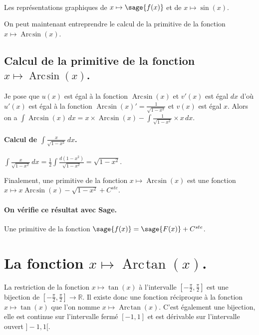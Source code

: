 \documentclass[a4paper,12pt]{report}
\def\eclaire{\mathbb}
\def\R{\ensuremath{\eclaire R}}
\renewcommand{\arcsin}{\mathop{\mathrm{Arc\mspace{2mu}sin}}}
\renewcommand{\arctan}{\mathop{\mathrm{Arc\mspace{2mu}tan}}}
\begin{document}
\begin{center}
\\
Les représentations graphiques de $x \mapsto \sage{f(x)} $ et de $x\mapsto \sin(x)$.
\end{center}
On peut maintenant entreprendre le calcul de la primitive de la  fonction  $x \mapsto \arcsin(x) $.

\subsection{Calcul de la primitive de la fonction  $x \mapsto \arcsin(x) $.}
Je pose que $u(x)$  est égal à la fonction $\arcsin(x)$ et $v'(x)$ est égal $dx$  d'où $u'(x)$  est égal à la fonction $\arcsin(x) ' = \frac{1}{\sqrt{1- x^2}} $ et $v(x)$ est égal $x$.
Alors on a $\int \arcsin(x) \, dx = x \times \arcsin(x) -\int \frac{1}{\sqrt{1- x^2}} \times x \, dx $.


\paragraph{Calcul de $\int \frac{x}{\sqrt{1- x^2}} \, dx $.}
$\int \frac{x}{\sqrt{1- x^2}} \, dx = \frac{1}{2} \int \frac{d(1-x^2)}{\sqrt{1- x^2}}= \sqrt{1- x^2} $.

Finalement, une primitive de la fonction $x \mapsto \arcsin(x) $ est une fonction  $ x \mapsto x \arcsin(x) - \sqrt{1- x^2} + C^{ste} $.
\paragraph{On vérifie ce résultat avec Sage.}
Une primitive de la fonction $\sage{f(x)} = \sage{F(x)} + C^{ste}$.


\section{La fonction  $x \mapsto \arctan(x) $.}
La restriction de la fonction $x \mapsto \tan(x) $ à l'intervalle $\left[-\frac{\pi}{2},\frac{\pi}{2}\right]$ est une bijection de $\left[-\frac{\pi}{2},\frac{\pi}{2}\right] \rightarrow \R $. Il existe donc une fonction réciproque à la fonction $x \mapsto \tan(x) $ que l'on nomme $x \mapsto \arctan(x) $. C'est également une bijection, elle est continue sur l'intervalle fermé  $ [-1,1]$ et est dérivable sur l'intervalle ouvert $]-1,1[$.
\end{document}
